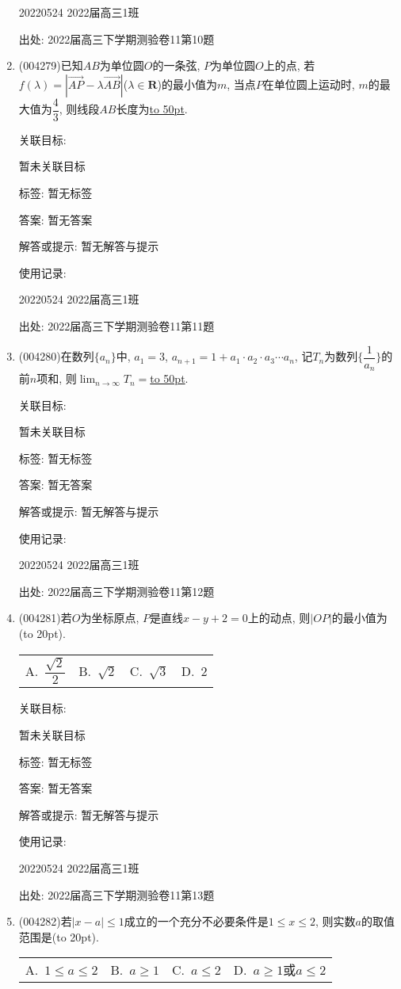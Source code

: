 \documentclass[10pt,a4paper]{article}
\newcommand{\blank}[1]{\underline{\hbox to #1pt{}}}
\newcommand{\bracket}[1]{(\hbox to #1pt{})}
\newcommand{\fourch}[4]{\par\begin{tabular}{p{.23\textwidth}p{.23\textwidth}p{.23\textwidth}p{.23\textwidth}}
A.~#1 &B.~#2& C.~#3& D.~#4
\end{tabular}}
\begin{document}
\begin{enumerate}[1.]
20220524	2022届高三1班	


出处: 2022届高三下学期测验卷11第10题
\item { (004279)}已知$AB$为单位圆$O$的一条弦, $P$为单位圆$O$上的点, 若$f(\lambda)=|\overrightarrow{AP}-\lambda\overrightarrow{AB}|$($\lambda\in \mathbf{R}$)的最小值为$m$, 当点$P$在单位圆上运动时, $m$的最大值为$\dfrac 43$, 则线段$AB$长度为\blank{50}.


关联目标:

暂未关联目标



标签: 暂无标签

答案: 暂无答案

解答或提示: 暂无解答与提示

使用记录:

20220524	2022届高三1班	


出处: 2022届高三下学期测验卷11第11题
\item { (004280)}在数列$\{a_n\}$中, $a_1=3$, $a_{n+1}=1+a_1\cdot a_2\cdot a_3\cdots a_n$, 记$T_n$为数列$\{\dfrac1 {a_n}\}$的前$n$项和, 则$\displaystyle\lim_{n\to\infty}T_n=$\blank{50}.


关联目标:

暂未关联目标



标签: 暂无标签

答案: 暂无答案

解答或提示: 暂无解答与提示

使用记录:

20220524	2022届高三1班	


出处: 2022届高三下学期测验卷11第12题
\item { (004281)}若$O$为坐标原点, $P$是直线$x-y+2=0$上的动点, 则$|OP|$的最小值为\bracket{20}.
\fourch{$\dfrac{\sqrt{2}}2$}{$\sqrt{2}$}{$\sqrt{3}$}{$2$}


关联目标:

暂未关联目标



标签: 暂无标签

答案: 暂无答案

解答或提示: 暂无解答与提示

使用记录:

20220524	2022届高三1班	


出处: 2022届高三下学期测验卷11第13题
\item { (004282)}若$|x-a|\le 1$成立的一个充分不必要条件是$1\le x\le 2$, 则实数$a$的取值范围是\bracket{20}.
\fourch{$1\le a\le 2$}{$a\ge 1$}{$a\le 2$}{$a\ge 1$或$a\le 2$}



\end{enumerate}
\end{document}
